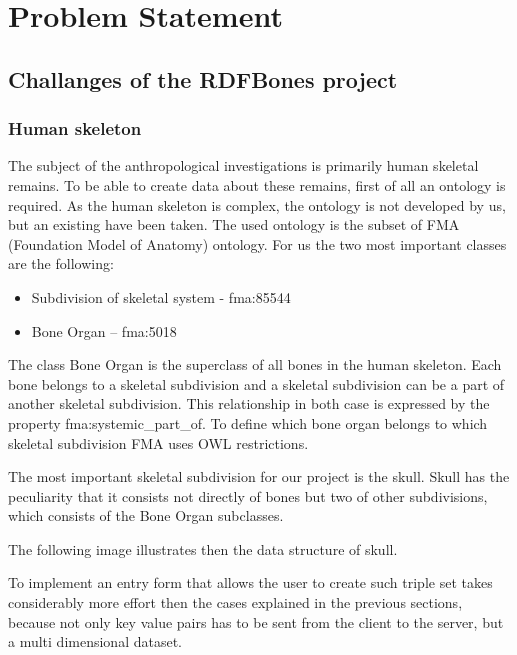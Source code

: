 \chapter{Problem Statement}

\section{Challanges of the RDFBones project}

\subsection{Human skeleton}

The subject of the anthropological investigations is primarily human skeletal remains. To be able to create data about these remains, first of all an ontology is required. As the human skeleton is complex, the ontology is not developed by us, but an existing have been taken. The used ontology is the subset of FMA (Foundation Model of Anatomy) ontology. For us the two most important classes are the following: 

\begin{itemize}
	\item Subdivision of skeletal system - fma:85544  
	\item Bone Organ – fma:5018
\end{itemize}

The class Bone Organ is the superclass of all bones in the human skeleton.  Each bone belongs to a skeletal subdivision and a skeletal subdivision can be a part of another skeletal subdivision. This relationship in both case is expressed by the property fma:systemic\_part\_of. To define which bone organ belongs to which skeletal subdivision FMA uses OWL restrictions.


The most important skeletal subdivision for our project is the skull. Skull has the peculiarity that it consists not directly of bones but two of other subdivisions, which consists of the Bone Organ subclasses.

%

The following image illustrates then the data structure of skull.


To implement an entry form that allows the user to create such triple set takes considerably more effort then the cases explained in the previous sections, because not only key value pairs has to be sent from the client to the server, but a multi dimensional dataset. 

